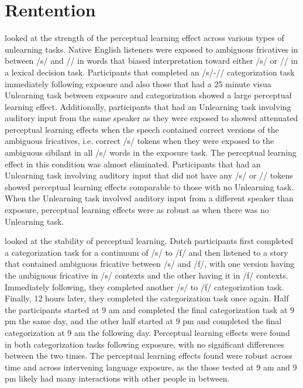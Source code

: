 \section{Rentention}

\citet{Kraljic2005} looked at the strength of the perceptual learning effect across various types of unlearning tasks. 
 Native English listeners were exposed to ambiguous fricatives in between /s/ and /\textesh/ in words that biased interpretation toward either /s/ or /\textesh/ in a lexical decision task.
 Participants that completed an /s/-/\textesh/ categorization task immediately following exposure and also those that had a 25 minute visua Unlearning task between exposure and categorization showed a large perceptual learning effect.  
Additionally, participants that had an Unlearning task involving auditory input from the same speaker as they were exposed to showed attenuated perceptual learning effects when the speech contained correct versions of the ambiguous fricatives, i.e. correct /s/ tokens when they were exposed to the ambiguous sibilant in all /s/ words in the exposure task.  
The perceptual learning effect in this condition was almost eliminated. 
 Participants that had an Unlearning task involving auditory input that did not have any /s/ or /\textesh/ tokens showed perceptual learning effects comparable to those with no Unlearning task.  
When the Unlearning task involved auditory input from a different speaker than exposure, perceptual learning effects were as robust as when there was no Unlearning task.

\citet{Eisner2006} looked at the stability of perceptual learning. 
Dutch participants first completed a categorization task for a continuum of /s/ to /f/ and then listened to a story that contained ambiguous fricative between /s/ and /f/, with one version having the ambiguous fricative in /s/ contexts and the other having it in /f/ contexts.
Immediately following, they completed another /s/ to /f/ categorization task.  
Finally, 12 hours later, they completed the categorization task once again.
Half the participants started at 9 am and completed the final categorization task at 9 pm the same day, and the other half started at 9 pm and completed the final categorization at 9 am the following day.
Perceptual learning effects were found in both categorization tasks following exposure, with no significant differences between the two times. 
 The perceptual learning effects found were robust across time and across intervening language exposure, as the those tested at 9 am and 9 pm likely had many interactions with other people in between.

